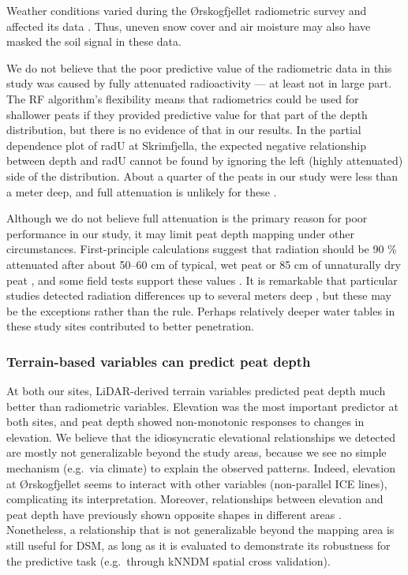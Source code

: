 \documentclass[soil, manuscript]{copernicus}
\begin{document}
Weather conditions varied during the Ørskogfjellet radiometric survey and affected its data \citep{ofstadHelicopterborneMagneticRadiometric2015}.
Thus, uneven snow cover and air moisture may also have masked the soil signal in these data.

We do not believe that the poor predictive value of the radiometric data in this study was caused by fully attenuated radioactivity --- at least not in large part.
The RF algorithm's flexibility means that radiometrics could be used for shallower peats if they provided predictive value for that part of the depth distribution, but there is no evidence of that in our results.
In the partial dependence plot of radU at Skrimfjella, the expected negative relationship between depth and radU cannot be found by ignoring the left (highly attenuated) side of the distribution.
About a quarter of the peats in our study were less than a meter deep, and full attenuation is unlikely for these \citep{beamishGammaRayAttenuation2013}.

Although we do not believe full attenuation is the primary reason for poor performance in our study, it may limit peat depth mapping under other circumstances.
First-principle calculations suggest that radiation should be 90 \% attenuated after about 50--60 cm of typical, wet peat or 85 cm of unnaturally dry peat \citep{beamishGammaRayAttenuation2013, beamishDetailedMappingPeat2024}, and some field tests support these values \citep{billenEignungGammaspektrometrieKartieren2015}.
It is remarkable that particular studies detected radiation differences up to several meters deep \citep{gatisMappingUplandPeat2019, kogantiMappingPeatDepth2023}, but these may be the exceptions rather than the rule.
Perhaps relatively deeper water tables in these study sites \citep[blanket bog, drained fen,][]{pricePeatlandRestorationHydrology2016} contributed to better penetration.

\subsubsection{Terrain-based variables can predict peat depth}

At both our sites, LiDAR-derived terrain variables predicted peat depth much better than radiometric variables.
Elevation was the most important predictor at both sites, and peat depth showed non-monotonic responses to changes in elevation.
We believe that the idiosyncratic elevational relationships we detected are mostly not generalizable beyond the study areas, because we see no simple mechanism (e.g.~via climate) to explain the observed patterns.
Indeed, elevation at Ørskogfjellet seems to interact with other variables (non-parallel ICE lines), complicating its interpretation.
Moreover, relationships between elevation and peat depth have previously shown opposite shapes in different areas \citep{finlaysonEstimatingOrganicSurface2021}.
Nonetheless, a relationship that is not generalizable beyond the mapping area is still useful for DSM, as long as it is evaluated to demonstrate its robustness for the predictive task (e.g.~through kNNDM spatial cross validation).
\end{document}
